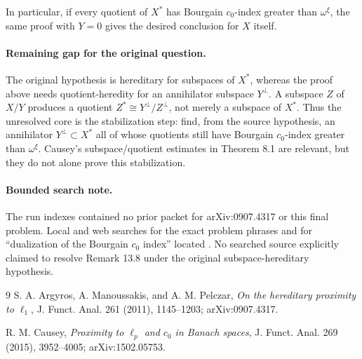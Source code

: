 \documentclass[11pt]{article}
\newcommand{\czero}{c_0}
\newcommand{\omegaord}{\omega}
\begin{document}
In particular, if every quotient of $X^*$ has Bourgain $\czero$-index greater than $\omegaord^\xi$, the same proof with $Y=0$ gives the desired conclusion for $X$ itself.

\paragraph{Remaining gap for the original question.}
The original hypothesis is hereditary for subspaces of $X^*$, whereas the proof above needs quotient-heredity for an annihilator subspace $Y^\perp$.  A subspace $Z$ of $X/Y$ produces a quotient $Z^*\cong Y^\perp/Z^\perp$, not merely a subspace of $X^*$.  Thus the unresolved core is the stabilization step: find, from the source hypothesis, an annihilator $Y^\perp\subset X^*$ all of whose quotients still have Bourgain $\czero$-index greater than $\omegaord^\xi$.  Causey's subspace/quotient estimates in Theorem 8.1 are relevant, but they do not alone prove this stabilization.

\paragraph{Bounded search note.}
The run indexes contained no prior packet for arXiv:0907.4317 or this final problem.  Local and web searches for the exact problem phrases and for ``dualization of the Bourgain $c_0$ index'' located \cite{Causey}.  No searched source explicitly claimed to resolve Remark 13.8 under the original subspace-hereditary hypothesis.

\begin{thebibliography}{9}
S. A. Argyros, A. Manoussakis, and A. M. Pelczar,
\emph{On the hereditary proximity to $\ell_1$},
J. Funct. Anal. 261 (2011), 1145--1203; arXiv:0907.4317.

R. M. Causey,
\emph{Proximity to $\ell_p$ and $c_0$ in Banach spaces},
J. Funct. Anal. 269 (2015), 3952--4005; arXiv:1502.05753.
\end{thebibliography}
\end{document}
